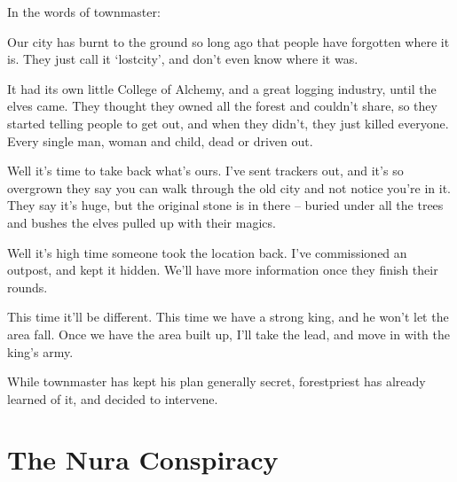 \begin{multicols}{2}

In the words of \gls{townmaster}:

\begin{exampletext}

	Our city has burnt to the ground so long ago that people have forgotten where it is.
	They just call it `\gls{lostcity}', and don't even know where it was.

	It had its own little College of Alchemy, and a great logging industry, until the elves came.  They thought they owned all the forest and couldn't share, so they started telling people to get out, and when they didn't, they just killed everyone.  Every single man, woman and child, dead or driven out.

	Well it's time to take back what's ours.
	I've sent trackers out, and it's so overgrown they say you can walk through the old city and not notice you're in it.
	They say it's huge, but the original stone is in there -- buried under all the trees and bushes the elves pulled up with their magics.

	Well it's high time someone took the location back.
	I've commissioned an outpost, and kept it hidden.
	We'll have more information once they finish their rounds.

	This time it'll be different.  This time we have a strong king, and he won't let the area fall.  Once we have the area built up, I'll take the lead, and move in with the king's army.

\end{exampletext}

While \gls{townmaster} has kept his plan generally secret, \gls{forestpriest} has already learned of it, and decided to intervene.

\end{multicols}

\section{The Nura Conspiracy}

